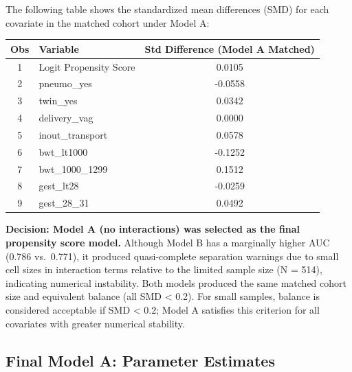\documentclass[
]{article}
\begin{document}
The following table shows the standardized mean differences (SMD) for
each covariate in the matched cohort under Model A:

\begin{longtable}[]{@{}clc@{}}
\toprule
Obs & Variable & Std Difference (Model A Matched) \\
\midrule
\endhead
1 & Logit Propensity Score & 0.0105 \\
2 & pneumo\_yes & -0.0558 \\
3 & twin\_yes & 0.0342 \\
4 & delivery\_vag & 0.0000 \\
5 & inout\_transport & 0.0578 \\
6 & bwt\_lt1000 & -0.1252 \\
7 & bwt\_1000\_1299 & 0.1512 \\
8 & gest\_lt28 & -0.0259 \\
9 & gest\_28\_31 & 0.0492 \\
\bottomrule
\end{longtable}

\textbf{Decision: Model A (no interactions) was selected as the final
propensity score model.} Although Model B has a marginally higher AUC
(0.786 vs.~0.771), it produced quasi-complete separation warnings due to
small cell sizes in interaction terms relative to the limited sample
size (N = 514), indicating numerical instability. Both models produced
the same matched cohort size and equivalent balance (all SMD \textless{}
0.2). For small samples, balance is considered acceptable if SMD
\textless{} 0.2; Model A satisfies this criterion for all covariates
with greater numerical stability.

\hypertarget{final-model-a-parameter-estimates}{%
\subsection{Final Model A: Parameter
Estimates}\label{final-model-a-parameter-estimates}}
\end{document}
